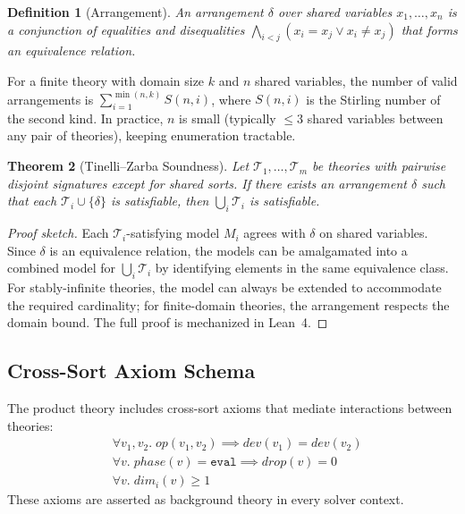 \documentclass[11pt]{article}
\newtheorem{theorem}{Theorem}
\newtheorem{definition}[theorem]{Definition}
\begin{document}
\begin{definition}[Arrangement]
An \emph{arrangement} $\delta$ over shared variables
$x_1, \ldots, x_n$ is a conjunction of equalities and disequalities
$\bigwedge_{i < j} (x_i = x_j \lor x_i \neq x_j)$ that forms an
equivalence relation.
\end{definition}

For a finite theory with domain size $k$ and $n$ shared variables,
the number of valid arrangements is $\sum_{i=1}^{\min(n,k)} S(n, i)$,
where $S(n,i)$ is the Stirling number of the second kind.
In practice, $n$ is small (typically $\leq 3$
shared variables between any pair of theories), keeping enumeration
tractable.

\begin{theorem}[Tinelli--Zarba Soundness]
Let $\mathcal{T}_1, \ldots, \mathcal{T}_m$ be theories with pairwise
disjoint signatures except for shared sorts.  If there exists an
arrangement $\delta$ such that each $\mathcal{T}_i \cup \{\delta\}$
is satisfiable, then $\bigcup_i \mathcal{T}_i$ is satisfiable.
\end{theorem}

\begin{proof}[Proof sketch]
Each $\mathcal{T}_i$-satisfying model $M_i$ agrees with $\delta$
on shared variables.  Since $\delta$ is an equivalence relation,
the models can be amalgamated into a combined model for
$\bigcup_i \mathcal{T}_i$ by identifying elements in the same
equivalence class.  For stably-infinite theories, the model can
always be extended to accommodate the required cardinality; for
finite-domain theories, the arrangement respects the domain bound.
The full proof is mechanized in Lean~4.
\end{proof}


\subsection{Cross-Sort Axiom Schema}

The product theory includes cross-sort axioms that mediate
interactions between theories:
\begin{align}
  &\forall v_1, v_2.\; \mathit{op}(v_1, v_2) \implies
    \mathit{dev}(v_1) = \mathit{dev}(v_2)
    \tag{DeviceCompat} \\
  &\forall v.\; \mathit{phase}(v) = \texttt{eval} \implies
    \mathit{drop}(v) = 0
    \tag{PhaseDrop} \\
  &\forall v.\; \mathit{dim}_i(v) \geq 1
    \tag{PosDim}
\end{align}
These axioms are asserted as background theory in every solver
context.
\end{document}
